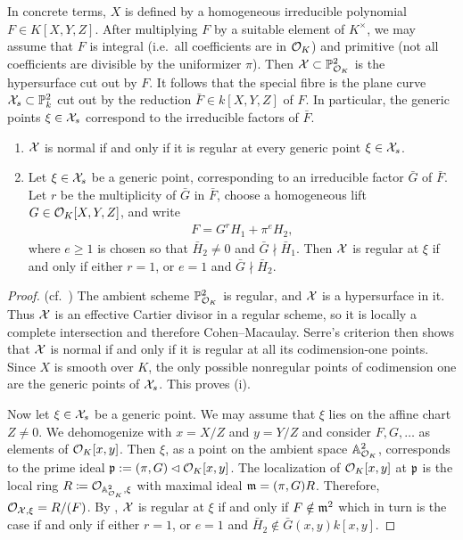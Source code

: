 In concrete terms, $X$ is defined by a homogeneous irreducible polynomial $F \in K[X,Y,Z]$. After multiplying $F$ by a suitable element of $K^\times$, we may assume that $F$ is integral (i.e.\ all coefficients are in $\mathcal O_K$) and primitive (not all coefficients are divisible by the uniformizer $\pi$). Then $\mathcal X\subset\mathbb P^2_{\mathcal O_K}$ is the hypersurface cut out by $F$. It follows that the special fibre is the plane curve $\mathcal X_s\subset\mathbb P^2_k$ cut out by the reduction $\bar{F}\in k[X,Y,Z]$ of $F$. In particular, the generic points $\xi\in\mathcal X_s$ correspond to the irreducible factors of $\bar{F}$.

\begin{proposition}\label{prop:plane-model-normality}
\begin{enumerate}[label=\textup{(\roman*)}]
\item\label{prop:plane-model-normality-i}
  $\mathcal X$ is normal if and only if it is regular at every generic point $\xi\in\mathcal X_s$.
\item\label{prop:plane-model-normality-ii}
  Let $\xi \in \mathcal X_s$ be a generic point, corresponding to an irreducible factor $\bar{G}$ of $\bar{F}$. Let $r$ be the multiplicity of $\bar G$ in $\bar F$, choose a homogeneous lift $G \in \mathcal O_K[X,Y,Z]$, and write
    \begin{align}
        F = G^r H_1 + \pi^e H_2,
    \end{align}
    where $e\geq1$ is chosen so that $\bar H_2\neq0$ and $\bar{G}\nmid \bar{H}_1$.
    Then $\mathcal X$ is regular at $\xi$ if and only if either $r=1$, or $e=1$ and $\bar{G}\nmid \bar{H}_2$.
\end{enumerate}
\end{proposition}

\begin{proof}
(cf.\ \cite[Example 8.2.26]{Liu})
The ambient scheme $\mathbb P^2_{\mathcal O_K}$ is regular, and $\mathcal X$ is a hypersurface in it. Thus $\mathcal X$ is an effective Cartier divisor in a regular scheme, so it is locally a complete intersection and therefore Cohen--Macaulay. Serre's criterion then shows that $\mathcal X$ is normal if and only if it is regular at all its codimension-one points. Since $X$ is smooth over $K$, the only possible nonregular points of codimension one are the generic points of $\mathcal X_s$. This proves (i).

Now let $\xi \in \mathcal X_s$ be a generic point. We may assume that $\xi$ lies on the affine chart $Z \neq 0$. We dehomogenize with  $x = X/Z$ and $y = Y/Z$ and consider $F,G,\ldots$ as elements of $\mathcal O_K[x,y]$. Then $\xi$, as a point on the ambient space $\mathbb A^2_{\mathcal O_K}$, corresponds to the prime ideal $\mathfrak p:=(\pi,G)\lhd\mathcal O_K[x,y]$. The localization of $\mathcal O_K[x,y]$ at $\mathfrak p$ is the local ring $R\coloneqq\mathcal{O}_{\mathbb A^2_{\mathcal O_K},\xi}$ with maximal ideal $\mathfrak m=(\pi,G)R$. Therefore, $\mathcal{O}_{\mathcal X,\xi}=R/(F)$. By \cite[Corollary 4.2.12]{Liu}, $\mathcal X$ is regular at $\xi$ if and only if $F \notin \mathfrak m^2$ which in turn is the case if and only if either $r=1$, or $e=1$ and $\bar{H}_2 \notin \bar{G}(x,y)k[x,y]$.
\end{proof}




